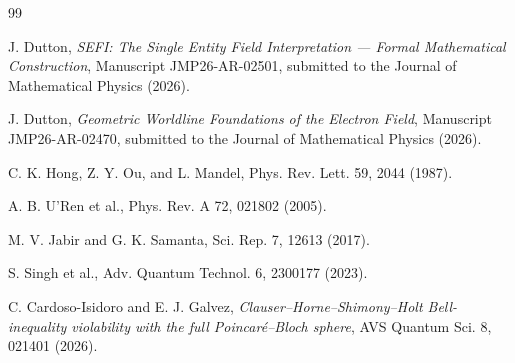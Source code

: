 \documentclass[aip, adv, reprint, superscriptaddress]{revtex4-2}
\begin{document}
\begin{thebibliography}{99}

J. Dutton, \textit{SEFI: The Single Entity Field Interpretation --- Formal Mathematical Construction}, 
Manuscript JMP26-AR-02501, submitted to the Journal of Mathematical Physics (2026).

J. Dutton, \textit{Geometric Worldline Foundations of the Electron Field}, 
Manuscript JMP26-AR-02470, submitted to the Journal of Mathematical Physics (2026).

C. K. Hong, Z. Y. Ou, and L. Mandel, Phys. Rev. Lett. 59, 2044 (1987).

A. B. U'Ren et al., Phys. Rev. A 72, 021802 (2005).

M. V. Jabir and G. K. Samanta, Sci. Rep. 7, 12613 (2017).

S. Singh et al., Adv. Quantum Technol. 6, 2300177 (2023).

C. Cardoso-Isidoro and E. J. Galvez, 
\textit{Clauser–Horne–Shimony–Holt Bell-inequality violability with the full Poincaré–Bloch sphere}, 
AVS Quantum Sci. 8, 021401 (2026).

\end{thebibliography}
\end{document}
